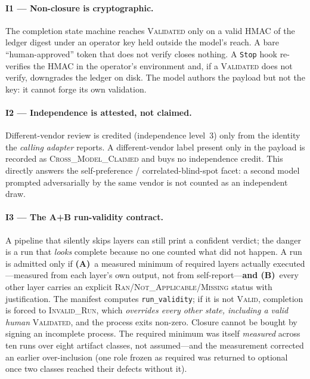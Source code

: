 \documentclass{article}
\begin{document}
\paragraph{I1 --- Non-closure is cryptographic.} The completion state machine reaches \textsc{Validated}
only on a valid HMAC of the ledger digest under an operator key held outside the model's reach. A bare
``human-approved'' token that does not verify closes nothing. A \texttt{Stop} hook re-verifies the HMAC
in the operator's environment and, if a \textsc{Validated} does not verify, downgrades the ledger on
disk. The model authors the payload but not the key: it cannot forge its own validation.

\paragraph{I2 --- Independence is attested, not claimed.} Different-vendor review is credited
(independence level~3) only from the identity the \emph{calling adapter} reports. A different-vendor
label present only in the payload is recorded as \textsc{Cross\_Model\_Claimed} and buys no independence
credit. This directly answers the self-preference / correlated-blind-spot facet: a second model prompted
adversarially by the same vendor is not counted as an independent draw.

\paragraph{I3 --- The A+B run-validity contract.} A pipeline that silently skips layers can still print
a confident verdict; the danger is a run that \emph{looks} complete because no one counted what did not
happen. A run is admitted only if \textbf{(A)}~a measured minimum of required layers actually
executed---measured from each layer's own output, not from self-report---\textbf{and (B)}~every other
layer carries an explicit \textsc{Ran}/\textsc{Not\_Applicable}/\textsc{Missing} status with
justification. The manifest computes \texttt{run\_validity}; if it is not \textsc{Valid}, completion is
forced to \textsc{Invalid\_Run}, which \emph{overrides every other state, including a valid human}
\textsc{Validated}, and the process exits non-zero. Closure cannot be bought by signing an incomplete
process. The required minimum was itself \emph{measured} across ten runs over eight artifact classes, not
assumed---and the measurement corrected an earlier over-inclusion (one role frozen as required was
returned to optional once two classes reached their defects without it).
\end{document}
